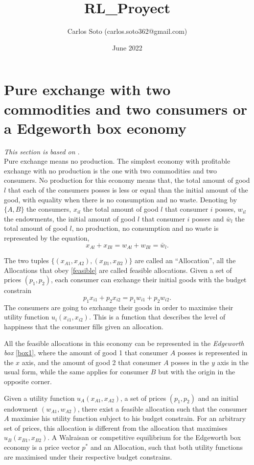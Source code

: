 \documentclass{article}
\title{RL\_Proyect}
\author{Carlos Soto (carlos.soto362@gmail.com)}
\date{June 2022}
\begin{document}
\maketitle

\section{Pure exchange with two commodities and two consumers or a Edgeworth box economy}
\textit{This section is based on \cite{mas-colell}}.\\
Pure exchange means no production. The simplest economy with profitable exchange with no production is the one with two commodities and two consumers. No production for this economy means that, the total amount of good $l$ that each of the consumers posses is less or equal than the initial amount of the good, with equality when there is no consumption and no waste. Denoting by $\{A,B\}$ the consumers, $x_{il}$ the total amount of good $l$ that consumer $i$ posses, $w_{il}$ the endowments, the initial amount of good $l$ that consumer $i$ posses and $\bar{w}_l$ the total amount of good $l$, no production, no consumption and no waste is represented by the equation,
\begin{equation}
\label{feasible}
    x_{Al} + x_{Bl} = w_{Al} + w_{Bl} = \bar{w}_l.
\end{equation}

The two tuples $\{(x_{A1},x_{A2}),(x_{B1},x_{B2})\}$ are called an ``Allocation'', all the Allocations that obey \cref{feasible} are called feasible allocations. Given a set of prices $(p_1,p_2)$, each consumer can exchange their initial goods with the budget constrain
\begin{equation}
    \label{budget}
    p_1x_{i1} + p_2x_{i2} = p_1w_{i1} + p_2w_{i2}.
\end{equation}
The consumers are going to exchange their goods in order to maximise their utility function $u_i(x_{i1},x_{i2})$. This is a function that describes the level of happiness that the consumer fills given an allocation. 

All the feasible allocations in this economy can be represented in the \textit{Edgeworth box} \cref{box1}, where the amount of good 1 that consumer $A$ posses is represented in the $x$ axis, and the amount of good 2 that consumer $A$ posses in the $y$ axis in the usual form, while the same applies for consumer $B$ but with the origin in the opposite corner. 

Given a utility function $u_A(x_{A1},x_{A2})$, a set of prices $(p_1,p_2)$ and an initial endowment $(w_{A1},w_{A2})$, there exist a feasible allocation such that the consumer $A$ maximise his utility function subject to his budget constrain. For an arbitrary set of prices, this allocation is different from the allocation that maximises $u_B(x_{B1},x_{B2})$. A Walraisan or competitive equilibrium for the Edgeworth box economy is a price vector $p^*$ and an Allocation, such that both utility functions are maximised under their respective budget constrains. 
\end{document}
